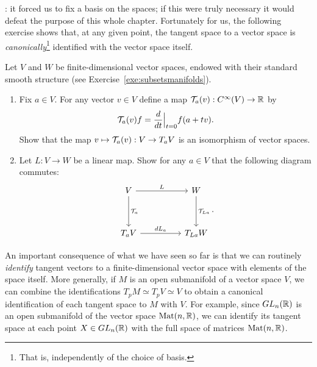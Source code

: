 : it forced us to fix a basis on the spaces; if this were truly necessary it would defeat the purpose of this whole chapter.
Fortunately for us, the following exercise shows that, at any given point, the tangent space to a vector space is \emph{canonically}\footnote{That is, independently of the choice of basis.} identified with the vector space itself.

\begin{exercise}\label{ex:tg_curve_iso}
	Let $V$ and $W$ be finite-dimensional vector spaces, endowed with their standard smooth structure (see Exercise~\ref{exe:subsetsmanifolds}).
	\begin{enumerate}
		\item Fix $a\in V$. For any vector $v\in V$ define a map $\mathcal{T}_a(v) : C^\infty(V) \to \mathbb{R}$ by
		      \begin{equation}
			      \mathcal{T}_a(v) f = \frac{d}{dt}\Big|_{t=0} f(a + tv).
		      \end{equation}
		      Show that the map $v\mapsto \mathcal{T}_a(v) : V \to T_aV$ is an isomorphism of vector spaces.
		\item Let $L:V\to W$ be a linear map. Show for any $a\in V$ that the following diagram commutes:
		      \begin{equation}
			      \begin{tikzcd}[row sep=huge, column sep=huge]
				      V \arrow[r, "L"] \arrow[d, "\cT_a"]
				      & W \arrow[d, "\cT_{La}"] \\
				      T_aV \arrow[r, "dL_a"]
				      & T_{La}W
			      \end{tikzcd}.
		      \end{equation}
	\end{enumerate}
\end{exercise}

An important consequence of what we have seen so far is that we can routinely \emph{identify} tangent vectors to a finite-dimensional vector space with elements of the space itself.
More generally, if $M$ is an open submanifold of a vector space $V$, we can combine the identifications $T_p M \simeq T_p V \simeq V$ to obtain a canonical identification of each tangent space to $M$ with $V$.
For example, since $GL_n(\mathbb{R})$ is an open submanifold of the vector space $\mathrm{Mat}(n, \mathbb{R})$, we can identify its tangent space at each point $X\in GL_n(\mathbb{R})$ with the full space of matrices $\mathrm{Mat}(n, \mathbb{R})$.

